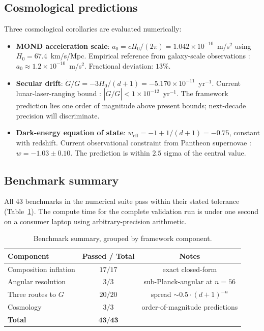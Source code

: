 \documentclass[11pt,twocolumn,a4paper]{article}
\theoremstyle{definition}
\theoremstyle{remark}
\newcommand{\Gnewton}{G}
\begin{document}
\subsection{Cosmological predictions}

Three cosmological corollaries are evaluated numerically:

\begin{itemize}[nosep]
\item \textbf{MOND acceleration scale}: $a_0 = c H_0 / (2\pi) = 1.042 \times 10^{-10}$~m/s$^2$ using $H_0 = 67.4$~km/s/Mpc. Empirical reference from galaxy-scale observations \citep{mcgaugh2011,mcgaugh2016}: $a_0 \approx 1.2\times 10^{-10}$~m/s$^2$. Fractional deviation: $13\%$.
\item \textbf{Secular drift}: $\dot\Gnewton / \Gnewton = -3H_0/(d+1) = -5.170\times 10^{-11}$~yr$^{-1}$. Current lunar-laser-ranging bound \citep{hofmann2010}: $|\dot\Gnewton/\Gnewton| < 1\times 10^{-12}$~yr$^{-1}$. The framework prediction lies one order of magnitude above present bounds; next-decade precision will discriminate.
\item \textbf{Dark-energy equation of state}: $w_{\mathrm{eff}} = -1 + 1/(d+1) = -0.75$, constant with redshift. Current observational constraint from Pantheon supernovae \citep{scolnic2018}: $w = -1.03 \pm 0.10$. The prediction is within $2.5$ sigma of the central value.
\end{itemize}

\subsection{Benchmark summary}

All 43 benchmarks in the numerical suite pass within their stated tolerance (Table~\ref{tab:benchmark_summary}). The compute time for the complete validation run is under one second on a consumer laptop using arbitrary-precision arithmetic.

\begin{table}[H]
\centering\small
\caption{Benchmark summary, grouped by framework component.}
\label{tab:benchmark_summary}
\begin{tabular}{lcc}
\toprule
\textbf{Component} & \textbf{Passed / Total} & \textbf{Notes}\\
\midrule
Composition inflation  & $17 / 17$ & exact closed-form\\
Angular resolution     & $3 / 3$   & sub-Planck-angular at $n{=}56$\\
Three routes to $\Gnewton$ & $20 / 20$ & spread $\sim 0.5\cdot(d{+}1)^{-n}$\\
Cosmology              & $3 / 3$   & order-of-magnitude predictions\\
\midrule
\textbf{Total}         & $\mathbf{43 / 43}$ &\\
\bottomrule
\end{tabular}
\end{table}
\end{document}
